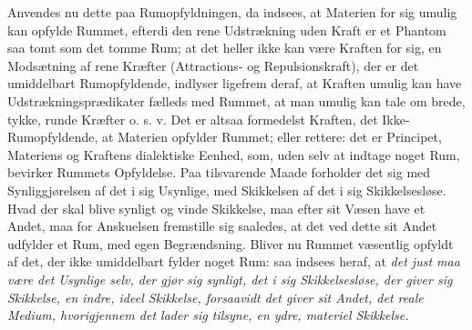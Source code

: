 \documentclass[12pt,a4paper]{book}
\begin{document}
Anvendes nu dette paa Rumopfyldningen, da indsees, at Materien for sig
umulig kan opfylde Rummet, efterdi den rene Udstrækning uden Kraft er et
Phantom saa tomt som det tomme Rum; at det heller ikke kan være Kraften
for sig, en Modsætning af rene Kræfter (Attractions- og
Repulsionskraft), der er det umiddelbart Rumopfyldende, indlyser
ligefrem deraf, at Kraften umulig kan have Udstrækningsprædikater fælleds
med Rummet, at man umulig kan tale om brede, tykke, runde Kræfter
o. s. v. Det er altsaa formedelst Kraften, det Ikke-Rumopfyldende, at
Materien opfylder Rummet; eller rettere: det er Principet, Materiens og
Kraftens dialektiske Eenhed, som, uden selv at indtage noget Rum,
bevirker Rummets Opfyldelse. Paa tilsvarende Maade forholder det sig med
Synliggjørelsen af det i sig Usynlige, med Skikkelsen af det i sig
Skikkelsesløse. Hvad der skal blive synligt og vinde Skikkelse, maa efter
sit Væsen have et Andet, maa for Anskuelsen fremstille sig saaledes, at
det ved dette sit Andet udfylder et Rum, med egen Begrændsning. Bliver
nu Rummet væsentlig opfyldt af det, der ikke umiddelbart fylder noget
Rum: saa indsees heraf, at \emph{det just maa være det Usynlige selv, der
gjør sig synligt, det i sig Skikkelsesløse, der giver sig Skikkelse, en
indre, ideel Skikkelse, forsaavidt det giver sit Andet, det reale Medium,
hvorigjennem det lader sig tilsyne, en ydre, materiel Skikkelse.}
\end{document}
